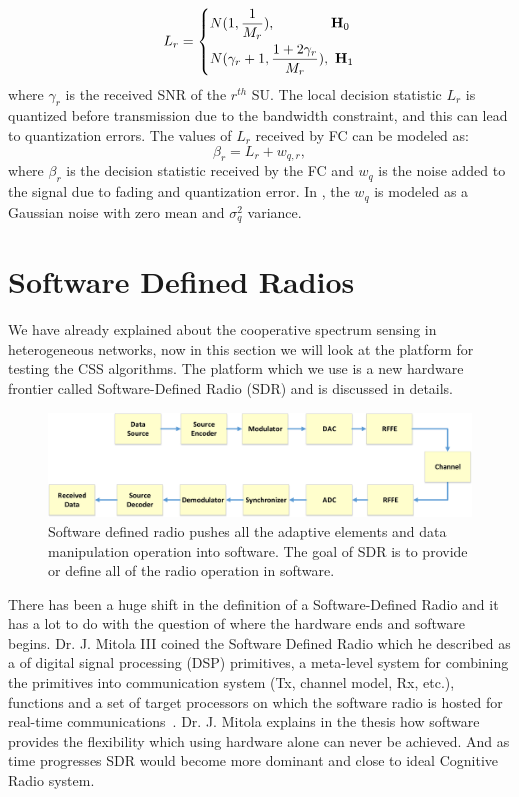 \begin{equation}
	\label{eq:6}
	L_r = 
	\left\{
	\begin{aligned}
		& N(1,\dfrac{1}{M_r}),~~~~~~~~~~~~\mathbf{H}_0 \\
		& N(\gamma_r+1,\dfrac{1+2\gamma_r}{M_r}),~\mathbf{H}_1		
	\end{aligned}
	\right.
\end{equation}
where $\gamma_r$ is the received SNR of the $r^{th}$ SU. The local decision statistic $L_r$ is quantized before transmission due to the bandwidth constraint, and this can lead to quantization errors. The values of $L_r$ received by FC can be modeled as:
\begin{equation}
	\label{eq:7}
	 \beta_r = L_r + w_{q,r},
\end{equation}
where $\beta_r$ is the decision statistic received by the FC and $w_q$ is the noise added to the signal due to fading and quantization error. In \cite{arhtn14}, the $w_q$ is modeled as a Gaussian noise with zero mean and $\sigma_q^2$ variance.

\section{Software Defined Radios}
We have already explained about the cooperative spectrum sensing in heterogeneous networks, now in this section we will look at the platform for testing the CSS algorithms. The platform which we use is a new hardware frontier called Software-Defined Radio (SDR) and is discussed in details.

\begin{figure}[ht!]
	\centering
	\includegraphics[width=\textwidth,keepaspectratio]{images/Gill/figs/softwaredefinedradio.eps}
    \caption{Software defined radio pushes all the adaptive elements and data manipulation operation into software. The goal of SDR is to provide or define all of the radio operation in software.} 
\label{sdr}      
\end{figure}

There has been a huge shift in the definition of a Software-Defined Radio and it has a lot to do with the question of where the hardware ends and software begins. Dr. J. Mitola III coined the Software Defined Radio which he described as a of digital signal processing (DSP) primitives, a meta-level system for combining the primitives into communication system (Tx, channel model, Rx, etc.), functions and a set of target processors on which the software radio is hosted for real-time communications~\cite{267870}. Dr. J. Mitola explains in the thesis how software provides the flexibility which using hardware alone can never be achieved. And as time progresses SDR would become more dominant and close to ideal Cognitive Radio system.

